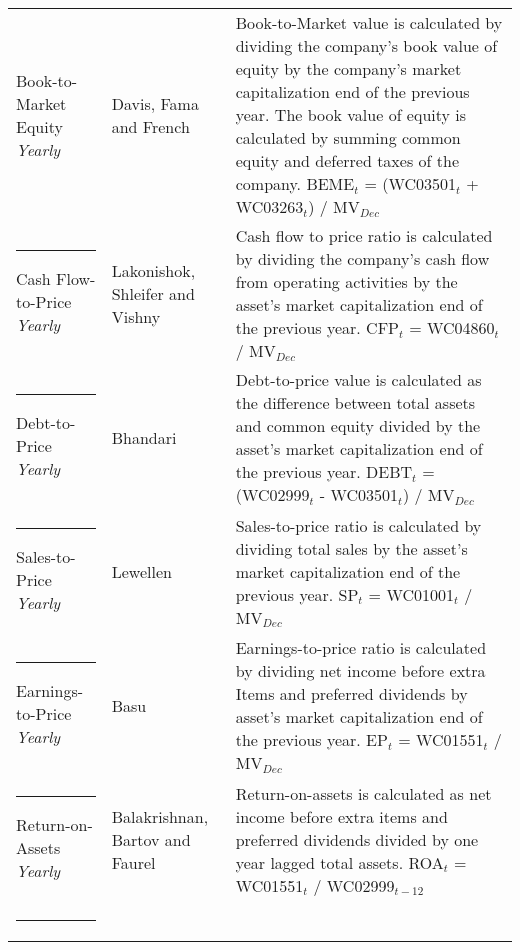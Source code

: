 \documentclass[12pt]{article}
\begin{document}
{{\begin{xltabular}{\textwidth}{ >{\raggedright\arraybackslash}p{0.23\textwidth} >{\raggedright\arraybackslash}p{0.2\textwidth} X}
Book-to-Market Equity \newline \emph{Yearly} 	& Davis, Fama and French \citeyearpar{Davis2000}	&  Book-to-Market value is calculated by dividing the company's book value of equity by the company's market capitalization end of the previous year. The book value of equity is calculated by summing common equity and deferred taxes of the company. \newline BEME$_t$ = (WC03501$_{t}$ + WC03263$_{t}$) /  MV$_{Dec}$\\ \rule{-1ex}{3ex}
Cash Flow-to-Price \newline \emph{Yearly}	& Lakonishok, Shleifer and Vishny  \citeyearpar{Lakonishok1994} 	& Cash flow to price ratio is calculated by dividing the company's cash flow from operating activities by the asset's market capitalization end of the previous year. \newline CFP$_t$ = WC04860$_{t}$ / MV$_{Dec}$\\ \rule{-1ex}{3ex}
Debt-to-Price \newline \emph{Yearly}			& Bhandari \citeyearpar{Bhandari1988}				& Debt-to-price value is calculated as the difference between total assets and common equity divided by the asset's market capitalization end of the previous year. \newline DEBT$_t$ = (WC02999$_{t}$ - WC03501$_{t}$) / MV$_{Dec}$\\ \rule{-1ex}{3ex}
Sales-to-Price 	\newline \emph{Yearly}		& Lewellen \citeyearpar{Lewellen2015}				& Sales-to-price ratio is calculated by dividing total sales by the asset's market capitalization end of the previous year. \newline SP$_t$ = WC01001$_{t}$ / MV$_{Dec}$ \\ \rule{-1ex}{3ex}
Earnings-to-Price \newline \emph{Yearly}		& Basu \citeyearpar{Basu1977}					& Earnings-to-price ratio is calculated by dividing net income before extra Items and preferred dividends by asset's market capitalization end of the previous year. \newline EP$_t$ = WC01551$_{t}$ / MV$_{Dec}$ \\ \rule{-1ex}{3ex}
Return-on-Assets \newline \emph{Yearly}		& Balakrishnan, Bartov and Faurel \citeyearpar{BALAKRISHNAN2010}	& Return-on-assets is calculated as net income before extra items and preferred dividends divided by one year lagged total assets. \newline ROA$_t$ = WC01551$_{t}$ / WC02999$_{t-12}$ \\ \rule{-1ex}{3ex}

\end{xltabular}}}
\end{document}
